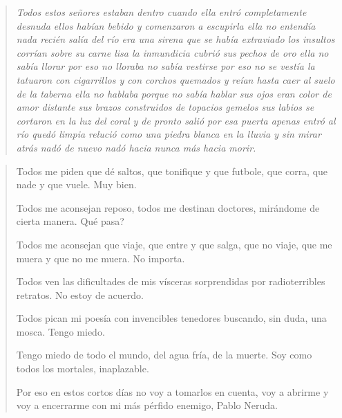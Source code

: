 \documentclass[12pt]{article}
\begin{document}
\clearpage
{}
\begin{verse}
\itshape
Todos estos señores estaban dentro  
cuando ella entró completamente desnuda  
ellos habían bebido y comenzaron a escupirla  
ella no entendía nada recién salía del río  
era una sirena que se había extraviado  
los insultos corrían sobre su carne lisa  
la inmundicia cubrió sus pechos de oro  
ella no sabía llorar por eso no lloraba  
no sabía vestirse por eso no se vestía  
la tatuaron con cigarrillos y con corchos quemados  
y reían hasta caer al suelo de la taberna  
ella no hablaba porque no sabía hablar  
sus ojos eran color de amor distante  
sus brazos construidos de topacios gemelos  
sus labios se cortaron en la luz del coral  
y de pronto salió por esa puerta  
apenas entró al río quedó limpia  
relució como una piedra blanca en la lluvia  
y sin mirar atrás nadó de nuevo  
nadó hacia nunca más hacia morir.  

\end{verse}

\clearpage
{}
\begin{verse}
Todos me piden que dé saltos,  
que tonifique y que futbole,  
que corra, que nade y que vuele.  
Muy bien.  

Todos me aconsejan reposo,  
todos me destinan doctores,  
mirándome de cierta manera.  
Qué pasa?  

Todos me aconsejan que viaje,  
que entre y que salga, que no viaje,  
que me muera y que no me muera.  
No importa.  

Todos ven las dificultades  
de mis vísceras sorprendidas  
por radioterribles retratos.  
No estoy de acuerdo.  

Todos pican mi poesía  
con invencibles tenedores  
buscando, sin duda, una mosca.  
Tengo miedo.  

Tengo miedo de todo el mundo,  
del agua fría, de la muerte.  
Soy como todos los mortales,  
inaplazable.  

Por eso en estos cortos días  
no voy a tomarlos en cuenta,  
voy a abrirme y voy a encerrarme  
con mi más pérfido enemigo,  
Pablo Neruda.  

\end{verse}
\end{document}
